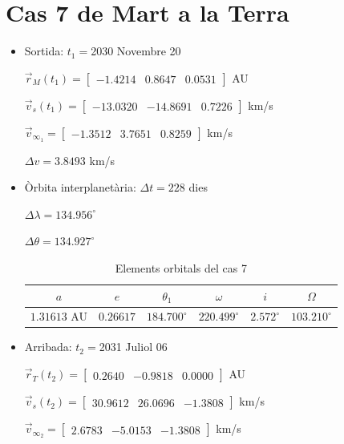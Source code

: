 \section{Cas 7 de Mart a la Terra}
\begin{itemize}
	\item Sortida: $t_{1}=$2030 Novembre 20

$\vec{r}_{M}(t_{1})=\begin{bmatrix}-1.4214 & 0.8647 & 0.0531\end{bmatrix}$ AU

$\vec{v}_{s}(t_{1})=\begin{bmatrix}-13.0320 & -14.8691 & 0.7226\end{bmatrix}$ km/s

$\vec{v}_{\infty_{1}}= \begin{bmatrix}-1.3512 & 3.7651 & 0.8259\end{bmatrix}$ km/s

$\Delta v=3.8493$ km/s

	\item Òrbita interplanetària: $\Delta t=228$ dies

$\Delta\lambda=134.956^{\circ}$

$\Delta\theta=134.927^{\circ}$
\begin{table}[h!]
	\centering
	\begin{tabular}{ |c|c|c|c|c|c|}
		\hline
		$a$ & $e$ & $\theta_{1}$ & $\omega$ & $i$ & $\Omega$ \\ \hline
		$1.31613$ AU  & $0.26617$ & $184.700^{\circ}$ & $220.499^{\circ}$ & $2.572^{\circ}$ & $103.210^{\circ}$ \\ \hline
	\end{tabular}
	\caption{Elements orbitals del cas 7}
\end{table}
	\item Arribada: $t_{2}=$2031 Juliol 06

$\vec{r}_{T}(t_{2})=\begin{bmatrix}0.2640 & -0.9818 & 0.0000\end{bmatrix}$ AU

$\vec{v}_{s}(t_{2})=\begin{bmatrix}30.9612 & 26.0696 & -1.3808\end{bmatrix}$ km/s


$\vec{v}_{\infty_{2}}=\begin{bmatrix}2.6783 & -5.0153 & -1.3808\end{bmatrix}$ km/s
\end{itemize}
